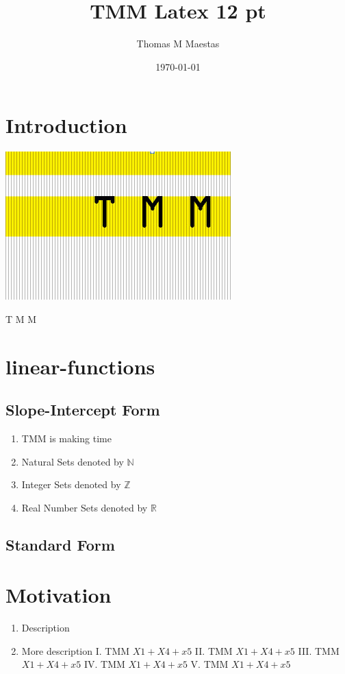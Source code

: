 \documentclass[12pt,letterpaper]{article}
\begin{document}
\date{\today}
\title{TMM Latex 12 pt}
\author{Thomas M Maestas}
\maketitle
\section{Introduction} 
\begin{center}
\includegraphics[scale=0.5]{../assets/TMM.jpg}
\end{center}
\begin{huge}T M M 
\end{huge}
\section{linear-functions}
\subsection{Slope-Intercept Form}
\begin{enumerate}
\item TMM is making time
\item Natural Sets denoted by $\mathbb{N}$
\item Integer Sets denoted by $\mathbb{Z}$
\item Real Number Sets denoted by $\mathbb{R}$
\end{enumerate}
\subsection{Standard Form}
\section{Motivation}
\begin{enumerate}
\item Description
\item More description
I. TMM $X1 + X4 +x5$
II. TMM $X1 + X4 +x5$
III. TMM $X1 + X4 +x5$
IV. TMM $X1 + X4 +x5$
V. TMM $X1 + X4 +x5$
\end{enumerate}
\end{document}
